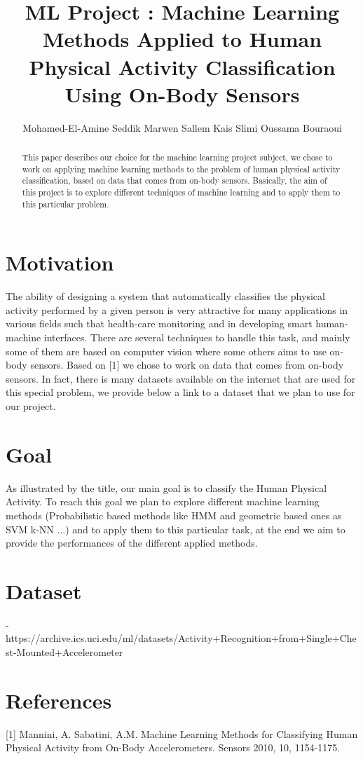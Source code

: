 \documentclass[10pt,a4paper,oneside]{article}
\author{Mohamed-El-Amine Seddik \hspace*{2em} Marwen Sallem \hspace*{2em} Kais Slimi \hspace*{2em} Oussama Bouraoui}
\title{ML Project : Machine Learning Methods Applied to Human Physical Activity Classification Using On-Body Sensors}
\begin{document}
\maketitle
\begin{abstract}
This paper describes our choice for the machine learning project subject, we chose to work on applying machine learning methods to the problem of human physical activity classification, based on data that comes from on-body sensors. Basically, the aim of this project is to explore different techniques of machine learning and to apply them to this particular problem.
\end{abstract}
\section*{Motivation}
The ability of designing a system that automatically classifies the physical activity performed by a given person is very attractive for many applications in various fields such that health-care monitoring and in developing smart human-machine interfaces. There are several techniques to handle this task, and mainly some of them are based on computer vision where some others aims to use on-body sensors. Based on [1] we chose to work on data that comes from on-body sensors. In fact, there is many datasets available on the internet that are used for this special problem, we provide below a link to a dataset that we plan to use for our project. 
\section*{Goal}
As illustrated by the title, our main goal is to classify the Human Physical Activity. To reach this goal we plan to explore different machine learning methods (Probabilistic based methods like HMM and geometric based ones as SVM k-NN ...) and to apply them to this particular task, at the end we aim to provide the performances of the different applied methods.
\section*{Dataset}
- https://archive.ics.uci.edu/ml/datasets/Activity+Recognition+from+Single+Chest-Mounted+Accelerometer


\section*{References}
[1] Mannini, A. Sabatini, A.M.	Machine Learning Methods for Classifying Human Physical Activity from On-Body Accelerometers. Sensors 2010, 10, 1154-1175.
\end{document}
